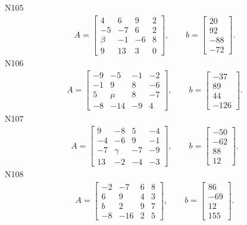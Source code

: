 \documentclass[11pt]{report}
\begin{document}
N105
\begin{align*}
 A = \left[\begin{matrix}4 & 6 & 9 & 2\\-5 & -7 & 6 & 2\\\beta & -1 & -6 & 8\\9 & 13 & 3 & 0\end{matrix}\right],
\qquad b = \left[\begin{matrix}20\\92\\-88\\-72\end{matrix}\right]. 
 \end{align*}
N106
\begin{align*}
 A = \left[\begin{matrix}-9 & -5 & -1 & -2\\-1 & 9 & 8 & -6\\5 & \mu & 8 & -7\\-8 & -14 & -9 & 4\end{matrix}\right],
\qquad b = \left[\begin{matrix}-37\\89\\44\\-126\end{matrix}\right]. 
 \end{align*}
N107
\begin{align*}
 A = \left[\begin{matrix}9 & -8 & 5 & -4\\-4 & -6 & 9 & -1\\-7 & \gamma & -7 & -9\\13 & -2 & -4 & -3\end{matrix}\right],
\qquad b = \left[\begin{matrix}-50\\-62\\88\\12\end{matrix}\right]. 
 \end{align*}
N108
\begin{align*}
 A = \left[\begin{matrix}-2 & -7 & 6 & 8\\6 & 9 & 4 & 3\\b & 2 & 9 & 7\\-8 & -16 & 2 & 5\end{matrix}\right],
\qquad b = \left[\begin{matrix}86\\-69\\12\\155\end{matrix}\right]. 
 \end{align*}
\end{document}
